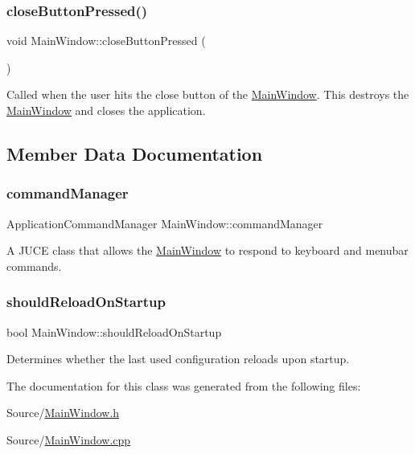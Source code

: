 \subsubsection{\texorpdfstring{close\+Button\+Pressed()}{closeButtonPressed()}}
{\footnotesize\ttfamily void Main\+Window\+::close\+Button\+Pressed (\begin{DoxyParamCaption}{ }\end{DoxyParamCaption})}

Called when the user hits the close button of the \mbox{\hyperlink{class_main_window}{Main\+Window}}. This destroys the \mbox{\hyperlink{class_main_window}{Main\+Window}} and closes the application. 

\subsection{Member Data Documentation}
\mbox{\label{class_main_window_ae36bb0085b5650e00bca6bab107dc691}} 
\subsubsection{\texorpdfstring{command\+Manager}{commandManager}}
{\footnotesize\ttfamily Application\+Command\+Manager Main\+Window\+::command\+Manager}

A J\+U\+CE class that allows the \mbox{\hyperlink{class_main_window}{Main\+Window}} to respond to keyboard and menubar commands. \mbox{\label{class_main_window_a1aa5cb4cc46f2ac7f90f8889f1347387}} 
\subsubsection{\texorpdfstring{should\+Reload\+On\+Startup}{shouldReloadOnStartup}}
{\footnotesize\ttfamily bool Main\+Window\+::should\+Reload\+On\+Startup}

Determines whether the last used configuration reloads upon startup. 

The documentation for this class was generated from the following files\+:\begin{DoxyCompactItemize}
\item 
Source/\mbox{\hyperlink{_main_window_8h}{Main\+Window.\+h}}\item 
Source/\mbox{\hyperlink{_main_window_8cpp}{Main\+Window.\+cpp}}\end{DoxyCompactItemize}
